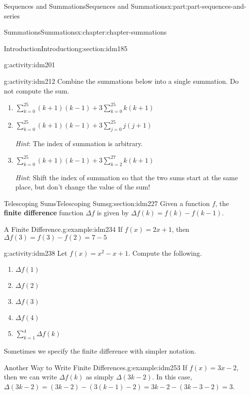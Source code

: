 \documentclass[oneside,10pt,]{book}
\newcommand{\terminology}[1]{\textbf{#1}}
\begin{document}
\begin{partptx}{Sequences and Summations}{}{Sequences and Summations}{}{}{x:part:part-sequences-and-series}
\begin{chapterptx}{Summations}{}{Summations}{}{}{x:chapter:chapter-summations}
\begin{sectionptx}{Introduction}{}{Introduction}{}{}{g:section:idm185}
\begin{activity}{}{g:activity:idm201}
\end{activity}
\begin{activity}{}{g:activity:idm212}%
Combine the summations below into a single summation. Do not compute the sum.%
\begin{enumerate}[font=\bfseries,label=(\alph*),ref=\alph*]
\item{}\(\displaystyle\sum_{k=0}^{25} (k+1)(k-1) + 3\sum_{k=0}^{25} k(k+1)\)\item{}\(\displaystyle\sum_{k=0}^{25} (k+1)(k-1) + 3\sum_{j=0}^{25} j(j+1)\)%
\par
\emph{Hint}: The index of summation is arbitrary.%
\item{}\(\displaystyle\sum_{k=0}^{25} (k+1)(k-1) + 3\sum_{k=2}^{27} k(k+1)\)%
\par
\emph{Hint}: Shift the index of summation so that the two sums start at the same place, but don't change the value of the sum!%
\end{enumerate}
\end{activity}
\end{sectionptx}
%
%
\typeout{************************************************}
\typeout{************************************************}
%
\begin{sectionptx}{Telescoping Sums}{}{Telescoping Sums}{}{}{g:section:idm227}
Given a function \(f\), the \terminology{finite difference} function \(\Delta f\) is given by \(\Delta f(k) = f(k) - f(k-1)\).%
\begin{example}{A Finite Difference.}{g:example:idm234}%
 If \(f(x) = 2x+1\), then \(\Delta f(3) = f(3) - f(2) = 7-5\)\end{example}
\begin{activity}{}{g:activity:idm238}%
Let \(f(x) = x^2-x+1\). Compute the following.%
\begin{enumerate}[font=\bfseries,label=(\alph*),ref=\alph*]
\item{}\(\Delta f(1)\)\item{}\(\Delta f(2)\)\item{}\(\Delta f(3)\)\item{}\(\Delta f(4)\)\item{}\(\displaystyle\sum_{k=1}^4\Delta f(k)\)\end{enumerate}
\end{activity}
Sometimes we specify the finite difference with simpler notation.%
\begin{example}{Another Way to Write Finite Differences.}{g:example:idm253}%
If \(f(x) = 3x-2\), then we can write \(\Delta f(k)\) as simply \(\Delta (3k-2)\). In this case, \(\Delta (3k-2) = (3k-2) - (3(k-1)-2) = 3k - 2 - (3k - 3 -2) = 3\).%

\end{example}
\end{sectionptx}
\end{chapterptx}
\end{partptx}
\end{document}
